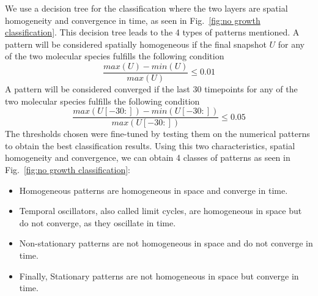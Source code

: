 We use a decision tree for the classification where the two layers are spatial homogeneity and convergence in time, as seen in Fig.~\ref{fig:no growth classification}.
This decision tree leads to the 4 types of patterns mentioned.
A pattern will be considered spatially homogeneous if the final snapshot $U$ for any of the two molecular species fulfills the following condition
\begin{equation}
    \frac{max(U) - min(U)}{max(U)} \leq 0.01
\end{equation}
A pattern will be considered converged if the last 30 timepoints for any of the two molecular species fulfills the following condition
\begin{equation}
    \frac{max(U[-30:]) - min(U[-30:])}{max(U[-30:])} \leq 0.05
\end{equation}
The thresholds chosen were fine-tuned by testing them on the numerical patterns to obtain the best classification results.
Using this two characteristics, spatial homogeneity and convergence, we can obtain 4 classes of patterns as seen in Fig.~\ref{fig:no growth classification}:
\begin{itemize}
    \item Homogeneous patterns are homogeneous in space and converge in time.
    \item Temporal oscillators, also called limit cycles, are homogeneous in space but do not converge, as they oscillate in time.
    \item Non-stationary patterns are not homogeneous in space and do not converge in time.
    \item Finally, Stationary patterns are not homogeneous in space but converge in time.
\end{itemize}

